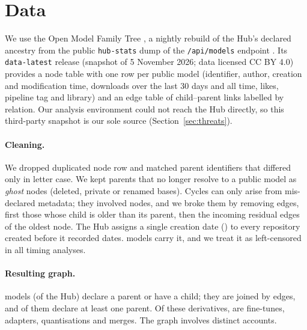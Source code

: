 \documentclass[11pt]{article}
\begin{document}
\section{Data}\label{sec:data}
We use the Open Model Family Tree \citep{h9tec2026}, a nightly rebuild of the Hub's declared ancestry from the public \texttt{hub-stats} dump of the \texttt{/api/models} endpoint \citep{hubstats}. Its \texttt{data-latest} release (snapshot of 5 November 2026; data licensed CC BY 4.0) provides a node table with one row per public model (identifier, author, creation and modification time, downloads over the last 30 days and all time, likes, pipeline tag and library) and an edge table of \nRawEdges child--parent links labelled by relation. Our analysis environment could not reach the Hub directly, so this third-party snapshot is our sole source (Section~\ref{sec:threats}).

\paragraph{Cleaning.} We dropped \nDupRows duplicated node row and matched \nRescued parent identifiers that differed only in letter case. We kept \nGhost parents that no longer resolve to a public model as \emph{ghost} nodes (deleted, private or renamed bases). Cycles can only arise from mis-declared metadata; they involved \nCycleNodes nodes, and we broke them by removing \nCycleEdges edges, first those whose child is older than its parent, then the incoming residual edges of the oldest node. The Hub assigns a single creation date (\backfillDate) to every repository created before it recorded dates. \nBackfill models carry it, and we treat it as left-censored in all timing analyses.

\paragraph{Resulting graph.} \nConnected models (\pctConnected of the Hub) declare a parent or have a child; they are joined by \nEdges edges, and \nChildren of them declare at least one parent. Of these derivatives, \pctFinetune are fine-tunes, \pctAdapter adapters, \pctQuantized quantisations and \pctMerge merges. The graph involves \nAuthors distinct accounts.
\end{document}
